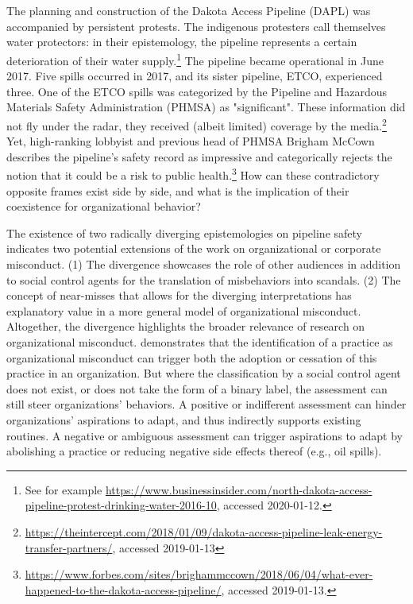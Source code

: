 \section{}

The planning and construction of the Dakota Access Pipeline (DAPL) was accompanied by persistent protests. The indigenous protesters call themselves water protectors: in their epistemology, the pipeline represents a certain deterioration of their water supply.\footnote{See for example \url{https://www.businessinsider.com/north-dakota-access-pipeline-protest-drinking-water-2016-10}, accessed 2020-01-12.} The pipeline became operational in June 2017. Five spills occurred in 2017, and its sister pipeline, ETCO, experienced three. One of the ETCO spills was categorized by the Pipeline and Hazardous Materials Safety Administration (PHMSA) as "significant". These information did not fly under the radar, they received (albeit limited) coverage by the media.\footnote{\url{https://theintercept.com/2018/01/09/dakota-access-pipeline-leak-energy-transfer-partners/}, accessed 2019-01-13} Yet, high-ranking lobbyist and previous head of PHMSA Brigham McCown describes the pipeline's safety record as impressive and categorically rejects the notion that it could be a risk to public health.\footnote{\url{https://www.forbes.com/sites/brighammccown/2018/06/04/what-ever-happened-to-the-dakota-access-pipeline/}, accessed 2019-01-13.} How can these contradictory opposite frames exist side by side, and what is the implication of their coexistence for organizational behavior?

The existence of two radically diverging epistemologies on pipeline safety indicates two potential extensions of the work on organizational or corporate misconduct. (1) The divergence showcases the role of other audiences in addition to social control agents \citep{Greve2010} for the translation of misbehaviors into scandals. (2) The concept of near-misses that allows for the diverging interpretations \citep{Carroll1998, Dillon2008} has explanatory value in a more general model of organizational misconduct. Altogether, the divergence highlights the broader relevance of research on organizational misconduct. \citet{Mohliver2019} demonstrates that the identification of a practice as organizational misconduct can trigger both the adoption or cessation of this practice in an organization. But where the classification by a social control agent does not exist, or does not take the form of a binary label, the assessment can still steer organizations' behaviors. A positive or indifferent assessment can hinder organizations' aspirations to adapt, and thus indirectly supports existing routines. A negative or ambiguous assessment can trigger aspirations to adapt by abolishing a practice or reducing negative side effects thereof (e.g., oil spills).

